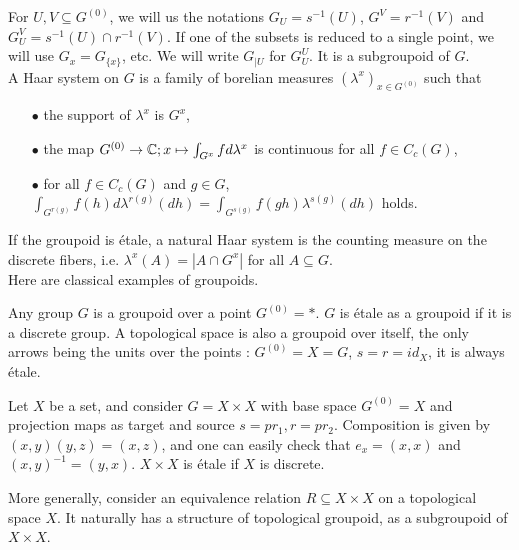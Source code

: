 For $U,V\subseteq G^{(0)}$, we will us the notations $G_U=s^{-1}(U)$, $G^V=r^{-1}(V)$ and $G_U^V=s^{-1}(U)\cap r^{-1}(V)$. If one of the subsets is reduced to a single point, we will use $G_x=G_{\{x\}}$, etc. We will write $G_{|U}$ for $G_U^U$. It is a subgroupoid of $G$.\\

A Haar system on $G$ is a family of borelian measures $(\lambda^x)_{x\in G^{(0)}}$ such that 
\begin{itemize}
\item[$\bullet$] the support of $\lambda^x$ is $G^x$, 
\item[$\bullet$] the map $G^{(0)} \rightarrow \mathbb C; x\mapsto \int_{G^x} f d\lambda^x$ is continuous for all $f\in C_c(G)$,
\item[$\bullet$] for all $f\in C_c(G)$ and $g\in G$, $\int_{G^{r(g)}} f(h) d\lambda^{r(g)}(dh)= \int_{G^{s(g)}} f(gh) \lambda^{s(g)}(dh)$ holds.
\end{itemize}

If the groupoid is étale, a natural Haar system is the counting measure on the discrete fibers, i.e. $\lambda^x(A) = |A\cap G^x|$ for all $A\subseteq G$.\\

Here are classical examples of groupoids.

\begin{Expl} Any group $G$ is a groupoid over a point $G^{(0)}=*$. $G$ is étale as a groupoid if it is a discrete group. A topological space is also a groupoid over itself, the only arrows being the units over the points : $G^{(0)} = X = G$, $s=r=id_X$, it is always étale.
\end{Expl}

\begin{Expl} Let $X$ be a set, and consider $G=X\times X$ with base space $G^{(0)}=X$ and projection maps as target and source $s=pr_1, r=pr_2$. Composition is given by $(x,y)(y,z)= (x,z)$, and one can easily check that $e_x=(x,x)$ and $(x,y)^{-1} = (y,x)$. $X\times X$ is étale if $X$ is discrete.
\end{Expl}

\begin{Expl} More generally, consider an equivalence relation $R \subseteq X\times X$ on a topological space $X$. It naturally has a structure of topological groupoid, as a subgroupoid of $X\times X$. 
\end{Expl}

